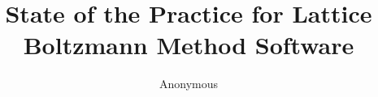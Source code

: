 \documentclass[final, 3p, times, authoryear]{elsarticle}
\begin{document}
\begin{frontmatter}



\title{State of the Practice for Lattice Boltzmann Method Software}


\author{Anonymous}



\begin{abstract}


\end{abstract}
\end{frontmatter}
\end{document}
